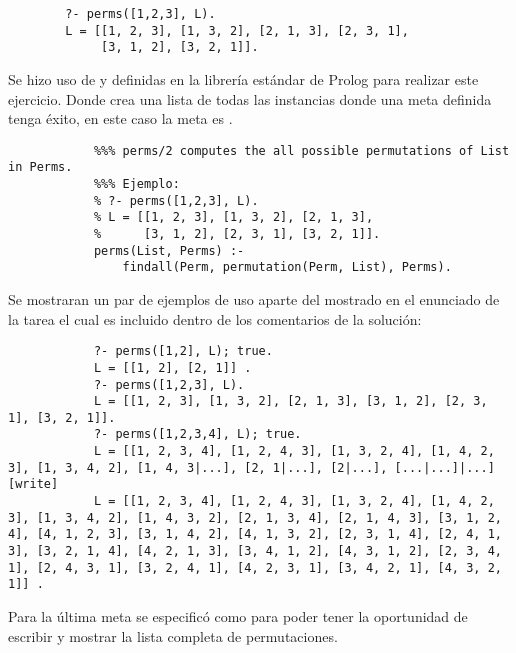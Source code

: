 \begin{enumerate}
    \begin{verbatim}
        ?- perms([1,2,3], L).
        L = [[1, 2, 3], [1, 3, 2], [2, 1, 3], [2, 3, 1],
             [3, 1, 2], [3, 2, 1]].
    \end{verbatim}
    \begin{solution}
        Se hizo uso de  y  definidas en la librería estándar de Prolog para realizar este ejercicio. Donde  crea una lista de todas las instancias donde una meta definida tenga éxito, en este caso la meta es .
        \begin{verbatim}
            %%% perms/2 computes the all possible permutations of List in Perms.
            %%% Ejemplo:
            % ?- perms([1,2,3], L).
            % L = [[1, 2, 3], [1, 3, 2], [2, 1, 3], 
            %      [3, 1, 2], [2, 3, 1], [3, 2, 1]].
            perms(List, Perms) :-
                findall(Perm, permutation(Perm, List), Perms).
        \end{verbatim}
        Se mostraran un par de ejemplos de uso aparte del mostrado en el enunciado de la tarea el cual es incluido dentro de los comentarios de la solución:
        \begin{verbatim}
            ?- perms([1,2], L); true.
            L = [[1, 2], [2, 1]] .
            ?- perms([1,2,3], L).
            L = [[1, 2, 3], [1, 3, 2], [2, 1, 3], [3, 1, 2], [2, 3, 1], [3, 2, 1]].
            ?- perms([1,2,3,4], L); true.
            L = [[1, 2, 3, 4], [1, 2, 4, 3], [1, 3, 2, 4], [1, 4, 2, 3], [1, 3, 4, 2], [1, 4, 3|...], [2, 1|...], [2|...], [...|...]|...] [write]
            L = [[1, 2, 3, 4], [1, 2, 4, 3], [1, 3, 2, 4], [1, 4, 2, 3], [1, 3, 4, 2], [1, 4, 3, 2], [2, 1, 3, 4], [2, 1, 4, 3], [3, 1, 2, 4], [4, 1, 2, 3], [3, 1, 4, 2], [4, 1, 3, 2], [2, 3, 1, 4], [2, 4, 1, 3], [3, 2, 1, 4], [4, 2, 1, 3], [3, 4, 1, 2], [4, 3, 1, 2], [2, 3, 4, 1], [2, 4, 3, 1], [3, 2, 4, 1], [4, 2, 3, 1], [3, 4, 2, 1], [4, 3, 2, 1]] .
        \end{verbatim}
        Para la última meta se especificó como  para poder tener la oportunidad de escribir  y mostrar la lista completa de permutaciones.
    \end{solution}
\end{enumerate}





